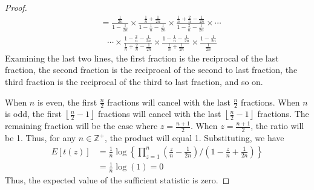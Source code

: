 \documentclass[12pt]{article}
\theoremstyle{plain}
\theoremstyle{remark}
\begin{document}
\begin{appendix}
\begin{proof}
\begin{align*}
	&= \frac{\frac{1}{2n}}{1-\frac{1}{2n}} \times \frac{\frac{1}{n} + \frac{1}{2n}}{1-\frac{1}{n} -  \frac{1}{2n}} \times \frac{\frac{1}{n} + \frac{2}{n} - \frac{1}{2n}}{1 - \frac{2}{n} - \frac{1}{2n}} \times \cdots\\
	&\hspace{10pt}\cdots \times \frac{1 - \frac{2}{n} - \frac{1}{2n}}{\frac{1}{n} + \frac{2}{n} - \frac{1}{2n}} \times \frac{1 -\frac{1}{n} - \frac{1}{2n}}{\frac{1}{n} + \frac{1}{2n}} \times \frac{1 - \frac{1}{2n}}{\frac{1}{2n}}
\end{align*}
Examining the last two lines, the first fraction is the reciprocal of the last fraction, the second fraction is the reciprocal of the second to last fraction, the third fraction is the reciprocal of the third to last fraction, and so on. 

When $n$ is even, the first $\frac{n}{2}$ fractions will cancel with the last $\frac{n}{2}$ fractions. When $n$ is odd, the first $\left\lfloor\frac{n}{2} - 1\right\rfloor$ fractions will cancel with the last $\left\lfloor\frac{n}{2} - 1\right\rfloor$ fractions. The remaining fraction will be the case where $z = \frac{n+1}{2}$. When $z = \frac{n+1}{2}$, the ratio will be 1. Thus, for any $n \in \mathbb{Z}^+$, the product will equal 1. Substituting, we have
\begin{align*}
	E\left[ t(z) \right] &= \frac{1}{n} \log \left\{ \prod_{z = 1}^n \left(\frac{z}{n} - \frac{1}{2n}\right) \bigg/ \left(1-\frac{z}{n} + \frac{1}{2n}\right) \right\} \\
	&= \frac{1}{n} \log(1) = 0
\end{align*}
Thus, the expected value of the sufficient statistic is zero.
\end{proof}


\end{appendix}

\end{document}
